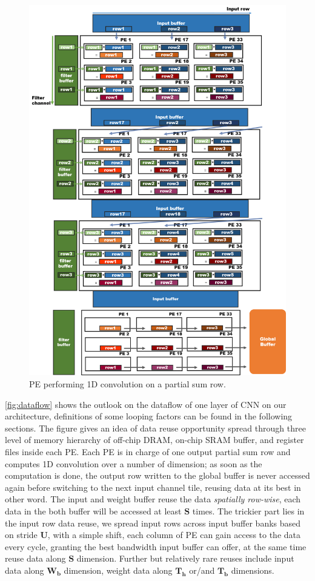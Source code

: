 \begin{figure}[h!]
    \centering
    \includegraphics[width=1\linewidth]{inc/4_proposed_architecture/figure/pe_dataflow.png}
    \caption{PE performing 1D convolution on a partial sum row.}
    \label{fig:pe_dataflow}
\end{figure}
\autoref{fig:dataflow} shows the outlook on the dataflow of one layer of CNN on our architecture, definitions of some looping factors can be found in the following sections. The figure gives an idea of data reuse opportunity spread through three level of memory hierarchy of off-chip DRAM, on-chip SRAM buffer, and register files inside each PE. Each PE is in charge of one output partial sum row and computes 1D convolution over a number of dimension; as soon as the computation is done, the output row written to the global buffer is never accessed again before switching to the next input channel tile, reusing data at its best in other word. The input and weight buffer reuse the data \textit{spatially row-wise}, each data in the both buffer will be accessed at least $\boldsymbol{S}$ times. The trickier part lies in the input row data reuse, we spread input rows across input buffer banks based on stride $\boldsymbol{U}$, with a simple shift, each column of PE can gain access to the data every cycle, granting the best bandwidth input buffer can offer, at the same time reuse data along $\boldsymbol{S}$ dimension. Further but relatively rare reuses include input data along $\boldsymbol{W_b}$ dimension, weight data along $\boldsymbol{T_h}$ or/and $\boldsymbol{T_b}$ dimensions.  \\
